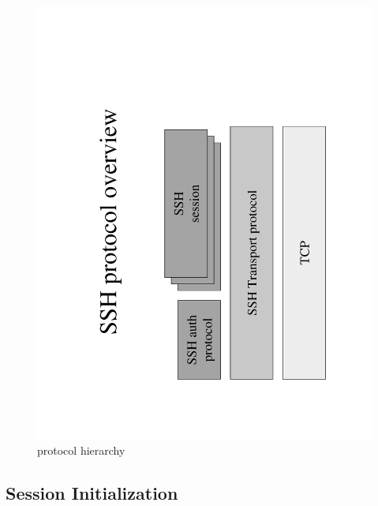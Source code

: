 \begin{center}
%
\begin{figure}
\begin{centering}
\includegraphics[clip,scale=0.4,angle=270]{ssh_overview}
\par\end{centering}

\caption{\label{fig:ssh-overview} protocol hierarchy}

\end{figure}

\par\end{center}


\subsection{Session Initialization}

